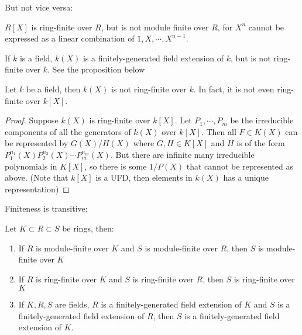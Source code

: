 \documentclass{note-eng}
\begin{document}
But not vice versa:

\begin{example}
    $R[X]$ is ring-finite over $R$, but is not module finite over $R$, for $X^n$ cannot be expressed as a linear combination of $1, X, \cdots, X^{n - 1}$.
\end{example}

\begin{example} 
    If $k$ is a field, $k(X)$ is a finitely-generated field extension of $k$, but is not ring-finite over $k$. See the proposition below
\end{example}

\begin{proposition} \label{prop:rational-not-ring-finite}
    Let $k$ be a field, then $k(X)$ is not ring-finite over $k$. In fact, it is not even ring-finite over $k[X]$.
\end{proposition}

\begin{proof}
    Suppose $k(X)$ is ring-finite over $k[X]$. Let $P_1, \cdots, P_m$ be the irreducible components of all the generators of $k(X)$ over $k[X]$. Then all $F \in K(X)$ can be represented by $G(X) / H(X)$ where $G, H \in K[X]$ and $H$ is of the form $P_1^{n_1}(X) P_2^{n_2}(X) \cdots P_m^{n_m}(X)$. But there are infinite many irreducible polynomials in $K[X]$, so there is some $1 / P(X)$ that cannot be represented as above. (Note that $k[X]$ is a UFD, then elements in $k(X)$ has a unique representation)
\end{proof}

Finiteness is transitive:

\begin{proposition}
    Let $K \subset R \subset S$ be rings, then:
    \begin{enumerate}
        \item If $R$ is module-finite over $K$ and $S$ is module-finite over $R$, then $S$ is module-finite over $K$
        \item If $R$ is ring-finite over $K$ and $S$ is ring-finite over $R$, then $S$ is ring-finite over $K$
        \item If $K, R, S$ are fields, $R$ is a finitely-generated field extension of $K$ and $S$ is a finitely-generated field extension of $R$, then $S$ is a finitely-generated field extension of $K$.
    \end{enumerate}
\end{proposition}
\end{document}

